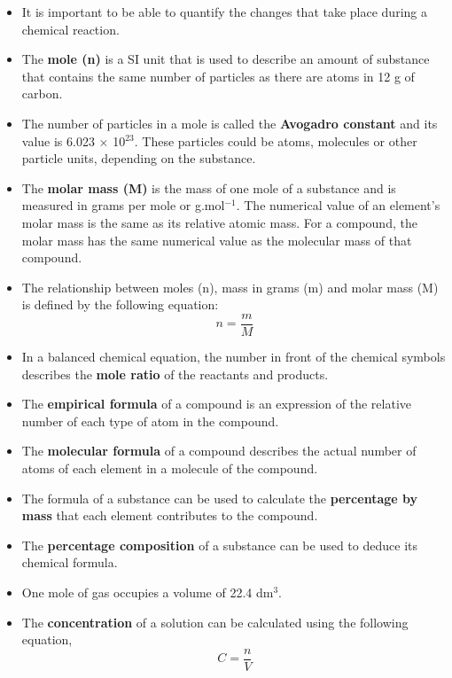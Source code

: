 \begin{itemize}
\item{It is important to be able to quantify the changes that take place during a chemical reaction.}
\item{The \textbf{mole (n)} is a SI unit that is used to describe an amount of substance that contains the same number of particles as there are atoms in 12 g of carbon.}
\item{The number of particles in a mole is called the \textbf{Avogadro constant} and its value is 6.023 $\times$ 10$^{23}$. These particles could be atoms, molecules or other particle units, depending on the substance.}
\item{The \textbf{molar mass (M)} is the mass of one mole of a substance and is measured in grams per mole or g.mol$^{-1}$. The numerical value of an element's molar mass is the same as its relative atomic mass. For a compound, the molar mass has the same numerical value as the molecular mass of that compound.}
\item{The relationship between moles (n), mass in grams (m) and molar mass (M) is defined by the following equation:
\begin{equation*}
n = \frac{m}{M}
\end{equation*}
}
\item{In a balanced chemical equation, the number in front of the chemical symbols describes the \textbf{mole ratio} of the reactants and products.}
\item{The \textbf{empirical formula} of a compound is an expression of the relative number of each type of atom in the compound.}
\item{The \textbf{molecular formula} of a compound describes the actual number of atoms of each element in a molecule of the compound.}
\item{The formula of a substance can be used to calculate the \textbf{percentage by mass} that each element contributes to the compound.}
\item{The \textbf{percentage composition} of a substance can be used to deduce its chemical formula.}
\item{One mole of gas occupies a volume of 22.4 dm$^{3}$.}
\item{The \textbf{concentration} of a solution can be calculated using the following equation,
\begin{equation*}
C = \frac{n}{V}
\end{equation*}

}
\end{itemize}
